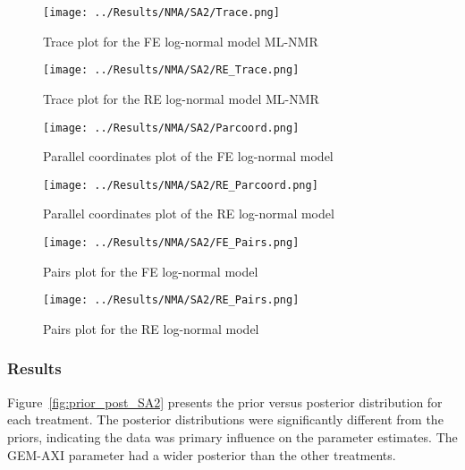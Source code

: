 \begin{figure}[h]
    \centering
    \begin{minipage}[b]{0.45\textwidth}
        \centering
        \texttt{[image: ../Results/NMA/SA2/Trace.png]}
        \caption{Trace plot for the FE log-normal model ML-NMR}
        \label{fig:traceSA2FE}
    \end{minipage}
    \hspace{0.05\textwidth}
    \begin{minipage}[b]{0.45\textwidth}
        \centering
        \texttt{[image: ../Results/NMA/SA2/RE\_Trace.png]}
        \caption{Trace plot for the RE log-normal model ML-NMR}
        \label{fig:traceSA2RE}
    \end{minipage}
\end{figure}

\begin{figure}[h]
    \centering
    \begin{minipage}[b]{0.45\textwidth}
        \centering
        \texttt{[image: ../Results/NMA/SA2/Parcoord.png]}
        \caption{Parallel coordinates plot of the FE log-normal model}
        \label{fig:parcoord_SA2}
    \end{minipage}
    \hspace{0.05\textwidth}
    \begin{minipage}[b]{0.45\textwidth}
        \centering
        \texttt{[image: ../Results/NMA/SA2/RE\_Parcoord.png]}
        \caption{Parallel coordinates plot of the RE log-normal model}
        \label{fig:RE_parcoord_SA2}
    \end{minipage}
\end{figure}

\begin{figure}[h]
    \centering
    \texttt{[image: ../Results/NMA/SA2/FE\_Pairs.png]}
    \caption{Pairs plot for the FE log-normal model}
    \label{fig:pairs_SA2}
\end{figure}

\begin{figure}[h]
    \centering
    \texttt{[image: ../Results/NMA/SA2/RE\_Pairs.png]}
    \caption{Pairs plot for the RE log-normal model}
    \label{fig:RE_pairs_SA2}
\end{figure}

\subsubsection{Results}
Figure~\ref{fig:prior_post_SA2} presents the prior versus posterior distribution for each treatment. The posterior distributions were significantly different from the priors, indicating the data was primary influence on the parameter estimates. The GEM-AXI parameter had a wider posterior than the other treatments. \\

